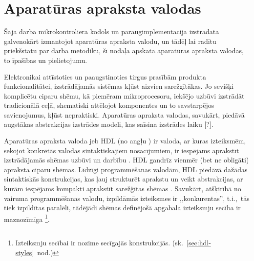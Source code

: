 



\section{Aparatūras apraksta valodas}
Šajā darbā mikrokontroliera kodols un paraugimplementācija izstrādāta
galvenokārt izmantojot aparatūras apraksta valodu, un tādēļ lai radītu
priekšstatu par darba metodiku, šī nodaļa apskata 
aparatūras apraksta valodas, to īpašības un pielietojumu.

Elektronikai attīstoties un paaugstinoties tirgus prasībām produkta funkcionalitātei,
izstrādājamās sistēmas kļūst aizvien sarežģītākas. Jo sevišķi komplicētu ciparu shēmu, 
kā piemēram mikroprocesoru, iekšējo uzbūvi izstrādāt tradicionālā ceļā,
shematiski attēlojot komponentes un to savstarpējos savienojumus, kļūst
nepraktiski. Aparatūras apraksta valodas, savukārt, piedāvā augstākas
abstrakcijas izstrādes modeli, kas saīsina izstrādes laiku [\todo{}?].

Aparatūras apraksta valoda jeb HDL
(no angļu )
ir valoda, ar kuras izteiksmēm, sekojot konkrētās 
valodas sintaktiskajiem nosa\-cī\-jumiem, ir iespējams aprakstīt
izstrādājamās shēmas uzbūvi un darbību \cite{HDL}. %
HDL gandrīz vienmēr (bet ne obligāti) apraksta ciparu shēmas.
Līdzīgi program\-mē\-šanas valodām, HDL piedāvā dažādas sintaktiskās 
konstrukcijas, kas ļauj strukturēt aprakstu un veikt abstrakcijas,
ar kurām iespējams kompakti aprakstīt sarežģītas shēmas
\cite[1.~lpp.]{Perry-VHDL}.
Savukārt, atšķirībā no vairuma programmēšanas valodu,
izpildāmās izteiksmes ir ,,konkurentas'', t.i.,~tās tiek izpildītas paralēli, 
tādējādi shēmas definējošā apgabala izteiksmju secība ir maznozīmīga%
\footnote{Izteiksmju secībai ir nozīme secīgajās konstrukcijās.
	(sk.~\ref{sec:hdl-styles}~nod.)}.

